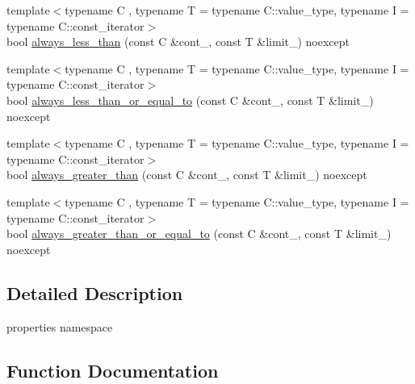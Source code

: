 \begin{DoxyCompactItemize}
\item 
{\footnotesize template$<$typename C , typename T  = typename C\+::value\+\_\+type, typename I  = typename C\+::const\+\_\+iterator$>$ }\\bool \mbox{\hyperlink{namespacearc_1_1prop_a965c4011bd27be186a9b63d69f27c4e4}{always\+\_\+less\+\_\+than}} (const C \&cont\+\_\+, const T \&limit\+\_\+) noexcept
\item 
{\footnotesize template$<$typename C , typename T  = typename C\+::value\+\_\+type, typename I  = typename C\+::const\+\_\+iterator$>$ }\\bool \mbox{\hyperlink{namespacearc_1_1prop_aa5ade88a045bf078e0dffe0418f133d5}{always\+\_\+less\+\_\+than\+\_\+or\+\_\+equal\+\_\+to}} (const C \&cont\+\_\+, const T \&limit\+\_\+) noexcept
\item 
{\footnotesize template$<$typename C , typename T  = typename C\+::value\+\_\+type, typename I  = typename C\+::const\+\_\+iterator$>$ }\\bool \mbox{\hyperlink{namespacearc_1_1prop_a0786e461abacc64a0479a9c29cebcfa9}{always\+\_\+greater\+\_\+than}} (const C \&cont\+\_\+, const T \&limit\+\_\+) noexcept
\item 
{\footnotesize template$<$typename C , typename T  = typename C\+::value\+\_\+type, typename I  = typename C\+::const\+\_\+iterator$>$ }\\bool \mbox{\hyperlink{namespacearc_1_1prop_a858cf86c6dc1c5ad0a337ac8adc7a787}{always\+\_\+greater\+\_\+than\+\_\+or\+\_\+equal\+\_\+to}} (const C \&cont\+\_\+, const T \&limit\+\_\+) noexcept
\end{DoxyCompactItemize}


\subsection{Detailed Description}
properties namespace 

\subsection{Function Documentation}
\mbox{\label{namespacearc_1_1prop_a0786e461abacc64a0479a9c29cebcfa9}} 
